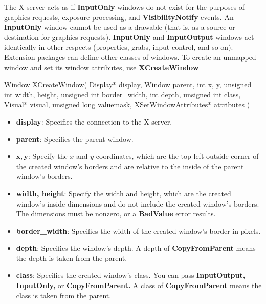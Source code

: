\documentclass{report}
\begin{document}
\begin{itemize}
            \bigbreak \noindent 
            The X server acts as if \textbf{InputOnly} windows do not exist for the purposes of graphics requests, exposure processing, and \textbf{VisibilityNotify} events. An \textbf{InputOnly} window cannot be used as a drawable (that is, as a source or destination for graphics requests). \textbf{InputOnly} and \textbf{InputOutput} windows act identically in other respects (properties, grabs, input control, and so on). Extension packages can define other classes of windows.
            \bigbreak \noindent 
            To create an unmapped window and set its window attributes, use \textbf{XCreateWindow}
            \bigbreak \noindent 
            \begin{cppcode}
                Window XCreateWindow(
                    Display* display, 
                    Window parent,
                    int x, y, 
                    unsigned int width, height, 
                    unsigned int border_width,
                    int depth,
                    unsigned int class,
                    Visual* visual,
                    unsigned long valuemask,
                    XSetWindowAttributes* attributes
                )
            \end{cppcode}
            \begin{itemize}
                \item \textbf{display}: Specifies the connection to the X server.
                \item \textbf{parent}: Specifies the parent window.
                \item \textbf{$\mathbf{x}, \mathbf{y}$}: Specify the $x$ and $y$ coordinates, which are the top-left outside corner of the created window’s borders and are relative to the inside of the parent window’s borders.
                \item \textbf{width, height}: Specify the width and height, which are the created window’s inside dimensions and do not include the created window’s borders. The dimensions must be nonzero, or a \textbf{BadValue} error results.
                \item \textbf{border\_width}: Specifies the width of the created window’s border in pixels.
                \item \textbf{depth}: Specifies the window’s depth. A depth of \textbf{CopyFromParent} means the depth is taken from the parent.
                \item \textbf{class}: Specifies the created window’s class. You can pass \textbf{InputOutput,} \textbf{InputOnly,} or \textbf{CopyFromParent.} A class of \textbf{CopyFromParent} means the class is taken from the parent.

\end{itemize}
\end{itemize}
\end{document}
